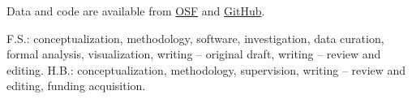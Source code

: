 \documentclass[pdflatex,sn-mathphys]{sn-jnl}
\begin{document}
 Data and code are available from \href{https://osf.io/nt98v/overview}{OSF} and \href{https://github.com/FabulousFabs}{GitHub}.

 F.S.: conceptualization, methodology, software, investigation, data curation, formal analysis, visualization, writing – original draft, writing – review and editing.  
H.B.: conceptualization, methodology, supervision, writing – review and editing, funding acquisition.



\end{document}
